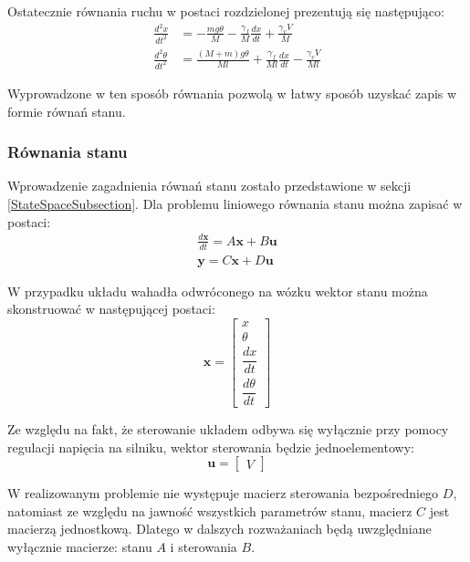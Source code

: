 \documentclass[12pt, twoside, openany]{report}
\theoremstyle{definition}
\begin{document}
Ostatecznie równania ruchu w postaci rozdzielonej prezentują się następująco:
\begin{equation} \label{SimpleEquation}
\begin{aligned}
\frac{d^2x}{dt^2} &= -\frac{mg \theta}{M} - \frac{\gamma_f}{M} \frac{dx}{dt} + \frac{\gamma_v V}{M}\\
\frac{d^2\theta}{dt^2} &= \frac{(M+m)g\theta}{Ml} + \frac{\gamma_f}{Ml}\frac{dx}{dt} - \frac{\gamma_vV}{Ml}
\end{aligned}
\end{equation}

Wyprowadzone w ten sposób równania pozwolą w łatwy sposób uzyskać zapis w formie równań stanu.

\subsubsection{Równania stanu}
Wprowadzenie zagadnienia równań stanu zostało przedstawione w sekcji \ref{StateSpaceSubsection}. Dla problemu liniowego równania stanu można zapisać w postaci:
\begin{equation}
\begin{aligned}
\frac{d\mathbf{x}}{dt} = A\mathbf{x} + B\mathbf{u} \\
\mathbf{y} = C\mathbf{x} + D\mathbf{u}
\end{aligned}
\end{equation}

W przypadku układu wahadła odwróconego na wózku wektor stanu można skonstruować w następującej postaci:
\begin{equation}
\mathbf{x} = 
\begin{bmatrix}
x \\ 
\theta \\ 
\dfrac{dx}{dt} \\[8pt] 
\dfrac{d\theta}{dt}
\end{bmatrix}
\end{equation}

Ze względu na fakt, że sterowanie układem odbywa się wyłącznie przy pomocy regulacji napięcia na silniku, wektor sterowania będzie jednoelementowy:
\begin{equation}
\mathbf{u} = 
\begin{bmatrix}
V
\end{bmatrix}
\end{equation}

W realizowanym problemie nie występuje macierz sterowania bezpośredniego $D$, natomiast ze względu na jawność wszystkich parametrów stanu, macierz $C$ jest macierzą jednostkową. Dlatego w dalszych rozważaniach będą uwzględniane wyłącznie macierze: stanu $A$ i sterowania $B$.
\end{document}

